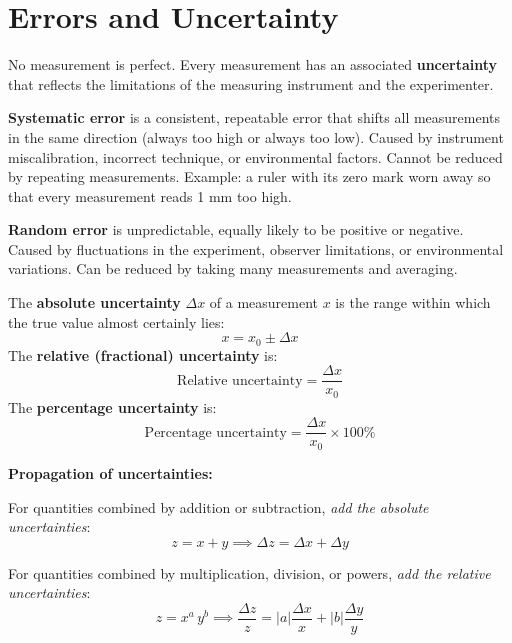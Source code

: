 \section{Errors and Uncertainty}
\label{sec:errors}

No measurement is perfect. Every measurement has an
associated \textbf{uncertainty} that reflects the
limitations of the measuring instrument and the experimenter.

\begin{definitionbox}
\textbf{Systematic error} is a consistent, repeatable error
that shifts all measurements in the same direction (always
too high or always too low). Caused by instrument
miscalibration, incorrect technique, or environmental
factors. Cannot be reduced by repeating measurements.
Example: a ruler with its zero mark worn away so that every
measurement reads 1 mm too high.

\vspace{0.4cm}

\textbf{Random error} is unpredictable, equally likely to
be positive or negative. Caused by fluctuations in the
experiment, observer limitations, or environmental
variations. Can be reduced by taking many measurements and
averaging.
\end{definitionbox}

\begin{definitionbox}
The \textbf{absolute uncertainty} $\Delta x$ of a
measurement $x$ is the range within which the true value
almost certainly lies:
\[
  x = x_0 \pm \Delta x
\]
The \textbf{relative (fractional) uncertainty} is:
\[
  \text{Relative uncertainty} = \frac{\Delta x}{x_0}
\]
The \textbf{percentage uncertainty} is:
\[
  \text{Percentage uncertainty} = \frac{\Delta x}{x_0}
  \times 100\%
\]
\end{definitionbox}

\textbf{Propagation of uncertainties:}

For quantities combined by addition or subtraction,
\textit{add the absolute uncertainties}:
\[
  z = x + y \implies \Delta z = \Delta x + \Delta y
\]

For quantities combined by multiplication, division, or
powers, \textit{add the relative uncertainties}:
\[
  z = x^a\,y^b \implies
  \frac{\Delta z}{z} = |a|\frac{\Delta x}{x}
  + |b|\frac{\Delta y}{y}
\]

